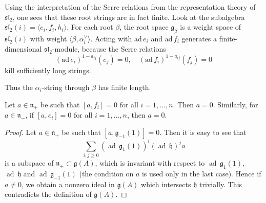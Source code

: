 \documentclass[12pt]{article}
\begin{document}
\begin{remark}
    Using the interpretation of the Serre relations from the representation theory of $\mathfrak{sl}_2$, one sees that these root strings are in fact finite. Look at the subalgebra
    $\mathfrak{sl}_2(i) = \langle e_i, f_i, h_i \rangle$. For each root $\beta$, the root space $\mathfrak{g}_\beta$ is a weight space of $\mathfrak{sl}_2(i)$ with weight $\langle \beta, \alpha_i^\vee \rangle$. Acting with $\mathrm{ad}\, e_i$ and $\mathrm{ad}\, f_i$ generates a finite-dimensional $\mathfrak{sl}_2$-module, because the Serre relations
    \[
        (\mathrm{ad}\, e_i)^{1-a_{ij}}(e_j) = 0, \quad
        (\mathrm{ad}\, f_i)^{1-a_{ij}}(f_j) = 0
    \]
    kill sufficiently long strings.

    Thus the $\alpha_i$-string through $\beta$ has finite length.
\end{remark}

\begin{lemma}
    Let $a \in \mathfrak{n}_+$ be such that $[a,f_i] = 0$ for all $i=1,\dots,n$.
    Then $a=0$. Similarly, for $a \in \mathfrak{n}_-$, if $[a,e_i]=0$ for all
    $i=1,\dots,n$, then $a=0$.
\end{lemma}

\begin{proof}
    Let $a \in \mathfrak{n}_+$ be such that $[a,\mathfrak{g}_{-1}(1)] = 0$.
    Then it is easy to see that
    \[
        \sum_{i,j \geq 0} (\operatorname{ad}\, \mathfrak{g}_1(1))^i
        (\operatorname{ad}\, \mathfrak{h})^j a
    \]
    is a subspace of $\mathfrak{n}_+ \subset \mathfrak{g}(A)$, which is invariant
    with respect to $\operatorname{ad}\,\mathfrak{g}_1(1)$,
    $\operatorname{ad}\,\mathfrak{h}$ and
    $\operatorname{ad}\,\mathfrak{g}_{-1}(1)$ (the condition on $a$ is used only
    in the last case). Hence if $a \neq 0$, we obtain a nonzero ideal in
    $\mathfrak{g}(A)$ which intersects $\mathfrak{h}$ trivially. This contradicts
    the definition of $\mathfrak{g}(A)$.
\end{proof}
\end{document}
